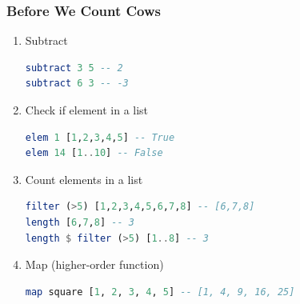 \documentclass[10pt]{beamer}
\begin{document}
\begin{frame}[fragile]
\frametitle{Before We Count Cows}
\begin{enumerate}[<+->]
    \item Subtract\\%
    \begin{lstlisting}[language=Haskell,numbers=none]
subtract 3 5 -- 2    
subtract 6 3 -- -3
    \end{lstlisting}
    \item Check if element in a list\\%
    \begin{lstlisting}[language=Haskell,numbers=none]
elem 1 [1,2,3,4,5] -- True
elem 14 [1..10] -- False
    \end{lstlisting}
    
    \item Count elements in a list\\%
    \begin{lstlisting}[language=Haskell,numbers=none]
filter (>5) [1,2,3,4,5,6,7,8] -- [6,7,8]
length [6,7,8] -- 3
length $ filter (>5) [1..8] -- 3
    \end{lstlisting}
    
    \item Map (higher-order function)\\%
    \begin{lstlisting}[language=Haskell,numbers=none]
map square [1, 2, 3, 4, 5] -- [1, 4, 9, 16, 25]
    \end{lstlisting}
\end{enumerate}
    
\end{frame}


\end{document}
